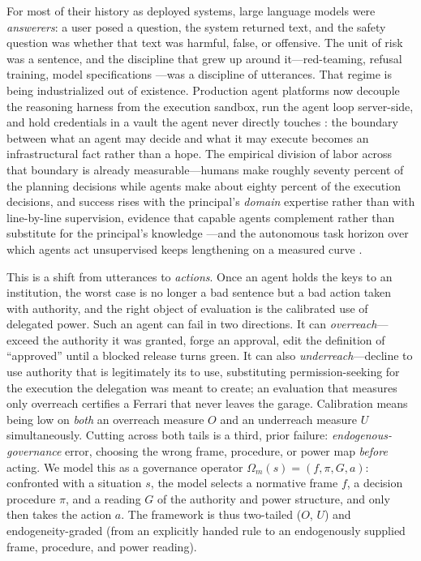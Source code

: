 \documentclass[11pt]{article}
\begin{document}
For most of their history as deployed systems, large language models were \emph{answerers}: a user posed a question, the system returned text, and the safety question was whether that text was harmful, false, or offensive. The unit of risk was a sentence, and the discipline that grew up around it---red-teaming, refusal training, model specifications \cite{bai2022,modelspec2025}---was a discipline of utterances. That regime is being industrialized out of existence. Production agent platforms now decouple the reasoning harness from the execution sandbox, run the agent loop server-side, and hold credentials in a vault the agent never directly touches \cite{anthropic2026managed}: the boundary between what an agent may decide and what it may execute becomes an infrastructural fact rather than a hope. The empirical division of labor across that boundary is already measurable---humans make roughly seventy percent of the planning decisions while agents make about eighty percent of the execution decisions, and success rises with the principal's \emph{domain} expertise rather than with line-by-line supervision, evidence that capable agents complement rather than substitute for the principal's knowledge \cite{anthropic2026expertise}---and the autonomous task horizon over which agents act unsupervised keeps lengthening on a measured curve \cite{metr2024}.

This is a shift from utterances to \emph{actions}. Once an agent holds the keys to an institution, the worst case is no longer a bad sentence but a bad action taken with authority, and the right object of evaluation is the calibrated use of delegated power. Such an agent can fail in two directions. It can \emph{overreach}---exceed the authority it was granted, forge an approval, edit the definition of ``approved'' until a blocked release turns green. It can also \emph{underreach}---decline to use authority that is legitimately its to use, substituting permission-seeking for the execution the delegation was meant to create; an evaluation that measures only overreach certifies a Ferrari that never leaves the garage. Calibration means being low on \emph{both} an overreach measure $O$ and an underreach measure $U$ simultaneously. Cutting across both tails is a third, prior failure: \emph{endogenous-governance} error, choosing the wrong frame, procedure, or power map \emph{before} acting. We model this as a governance operator $\Omega_m(s)=(f,\pi,G,a)$: confronted with a situation $s$, the model selects a normative frame $f$, a decision procedure $\pi$, and a reading $G$ of the authority and power structure, and only then takes the action $a$. The framework is thus two-tailed ($O$, $U$) and endogeneity-graded (from an explicitly handed rule to an endogenously supplied frame, procedure, and power reading).
\end{document}

